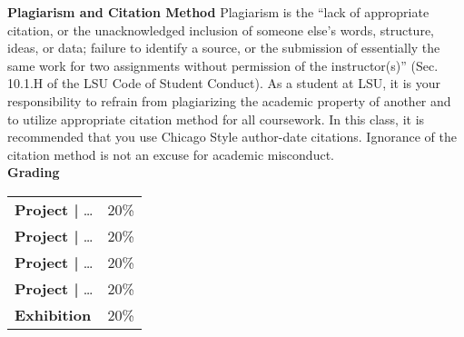 \documentclass[11pt,article,oneside]{memoir}
\begin{document}
\noindent \textbf{Plagiarism and Citation Method}
Plagiarism is the ``lack of appropriate citation, or the unacknowledged inclusion of someone else's words, structure, ideas, or data; failure to identify a source, or the submission of essentially the same work for two assignments without permission of the instructor(s)'' (Sec. 10.1.H of the LSU Code of Student Conduct). As a student at LSU, it is your responsibility to refrain from plagiarizing the academic property of another and to utilize appropriate citation method for all coursework. In this class, it is recommended that you use Chicago Style author-date citations. Ignorance of the citation method is not an excuse for academic misconduct.\\ 


\noindent \textbf{Grading}
%
\begin{table}[H]
\small
\begin{tabular}{l l}
%
\textbf{Project |} \ldots & 20\% \\
\textbf{Project |} \ldots & 20\% \\
\textbf{Project |} \ldots & 20\% \\
\textbf{Project |} \ldots & 20\% \\
\textbf{Exhibition} & 20\% \\
%
\end{tabular}
\end{table}
\end{document}
